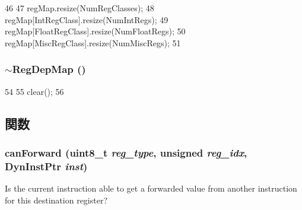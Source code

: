 \begin{DoxyCode}
46 {
47     regMap.resize(NumRegClasses);
48     regMap[IntRegClass].resize(NumIntRegs);
49     regMap[FloatRegClass].resize(NumFloatRegs);
50     regMap[MiscRegClass].resize(NumMiscRegs);
51 }
\end{DoxyCode}
\hypertarget{classRegDepMap_abdbd8b917a4492cf43256c3962f97cb3}{
\subsubsection[{$\sim$RegDepMap}]{\setlength{\rightskip}{0pt plus 5cm}$\sim${\bf RegDepMap} ()}}
\label{classRegDepMap_abdbd8b917a4492cf43256c3962f97cb3}



\begin{DoxyCode}
54 {
55     clear();
56 }
\end{DoxyCode}


\subsection{関数}
\hypertarget{classRegDepMap_a700524c6365911232dd3afe88da67f0a}{
\subsubsection[{canForward}]{ canForward (uint8\_\-t {\em reg\_\-type}, \/  unsigned {\em reg\_\-idx}, \/  {\bf DynInstPtr} {\em inst})}}
\label{classRegDepMap_a700524c6365911232dd3afe88da67f0a}
Is the current instruction able to get a forwarded value from another instruction for this destination register? 


